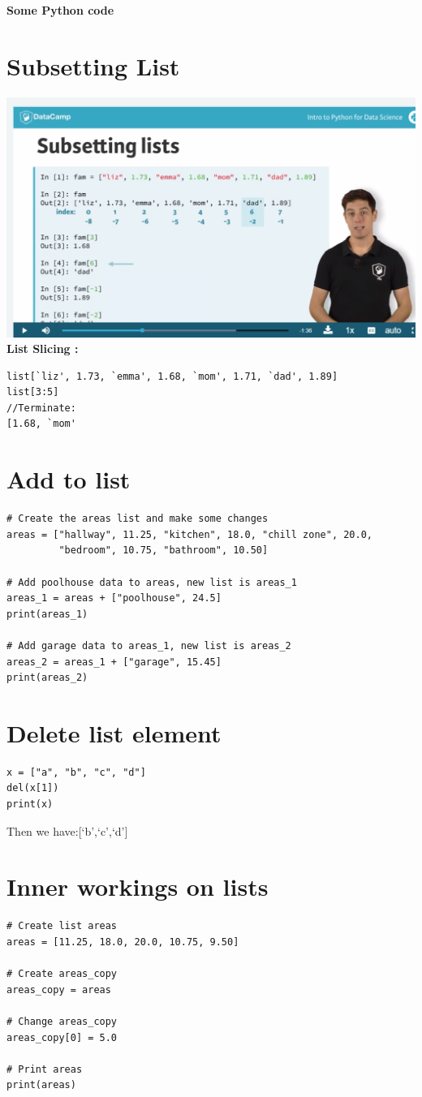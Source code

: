 \documentclass[12pt]{article}
\begin{document}
\begin{center}
\textbf{Some Python code}
\end{center}
\section{Subsetting List}
\includegraphics[scale=0.8]{hinh}
\textbf{List Slicing :}
\begin{lstlisting}
list[`liz', 1.73, `emma', 1.68, `mom', 1.71, `dad', 1.89]
list[3:5]
//Terminate:
[1.68, `mom'
\end{lstlisting}
\section{Add to list}
\begin{lstlisting}
# Create the areas list and make some changes
areas = ["hallway", 11.25, "kitchen", 18.0, "chill zone", 20.0,
         "bedroom", 10.75, "bathroom", 10.50]

# Add poolhouse data to areas, new list is areas_1
areas_1 = areas + ["poolhouse", 24.5]
print(areas_1) 

# Add garage data to areas_1, new list is areas_2
areas_2 = areas_1 + ["garage", 15.45]
print(areas_2)
\end{lstlisting}
\section{Delete list element}
\begin{lstlisting}
x = ["a", "b", "c", "d"]
del(x[1])
print(x)
\end{lstlisting}
Then we have:[`b',`c',`d']
\section{Inner workings on lists}
\begin{lstlisting}
# Create list areas
areas = [11.25, 18.0, 20.0, 10.75, 9.50]

# Create areas_copy
areas_copy = areas

# Change areas_copy
areas_copy[0] = 5.0

# Print areas
print(areas)
\end{lstlisting}
\end{document}
